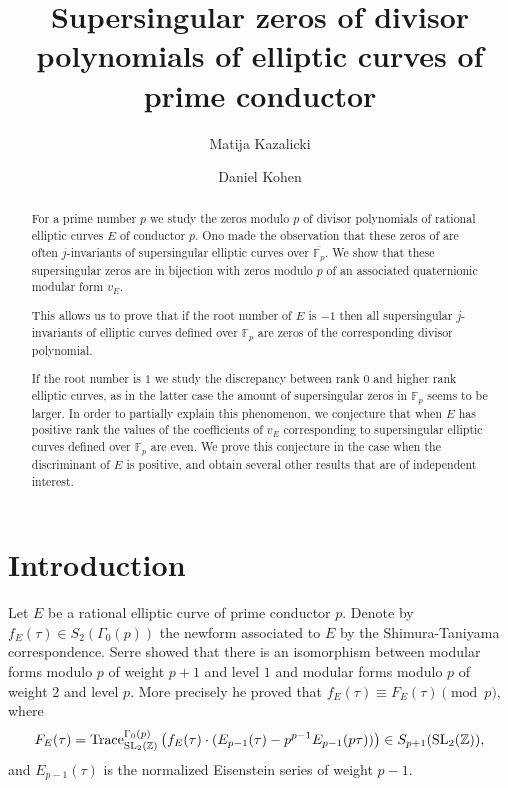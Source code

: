 \documentclass[13pt]{amsart}
\author{Matija Kazalicki}
\author{Daniel Kohen}
\title{Supersingular zeros of divisor polynomials of elliptic curves of prime conductor}
\theoremstyle{remark}
\numberwithin{theorem}{section} \numberwithin{equation}{section}
\begin{document}
\maketitle

\begin{abstract}
For a prime number $p$ we study the zeros modulo $p$ of divisor polynomials of 
rational elliptic curves $E$ of conductor $p$. Ono \cite[p.~118]{Ono} made 
the 
observation that these zeros of are often $j$-invariants of supersingular 
elliptic curves over $\overline{\mathbb{F}_p}$. We show that these supersingular zeros are 
in bijection with zeros modulo $p$ of an associated quaternionic modular form 
$v_E$. 

This allows us to prove that if the root number of $E$ is $-1$ then all 
supersingular $j$-invariants of elliptic curves defined over $\mathbb{F}_{p}$ 
are zeros of the corresponding divisor polynomial. 

If the root number is $1$ we study the discrepancy between rank $0$ and higher 
rank elliptic curves, as in the latter case the amount of supersingular zeros 
in $\mathbb{F}_p$ seems to be larger.
In order to partially explain this phenomenon, we conjecture that when $E$ has 
positive rank the values of the coefficients of $v_E$ corresponding to 
supersingular elliptic curves defined over $\mathbb{F}_p$ are even. We prove 
this conjecture in the case when the discriminant of $E$ is positive, and 
obtain several other results that are of independent interest.

\end{abstract}

\section{Introduction}
Let $E$ be a rational elliptic curve of prime conductor $p$. Denote by $f_E(\tau)\in S_2(\Gamma_0(p))$ the newform associated to $E$ by the Shimura-Taniyama correspondence. 
Serre \cite[Theorem ~11]{Ser2} showed that there is an isomorphism between 
modular forms modulo $p$ of weight $p+1$ and level $1$ and modular forms modulo 
$p$ of weight $2$ and 
level $p$. More precisely he proved that $f_E(\tau) \equiv F_E(\tau) 
\pmod{p}$, where
\[
F_E(\tau)=\textrm{Trace}^{\Gamma_0(p)}_{{{\text {\rm SL}}}_2({\mathbb{Z}})}\left( f_E(\tau)\cdot( E_{p-1}(\tau)-p^{p-1}E_{p-1}(p\tau))\right)\in S_{p+1}({{\text {\rm SL}}}_2({\mathbb{Z}})),
\]
and $E_{p-1}(\tau)$ is the normalized Eisenstein series of weight $p-1$.
\end{document}
